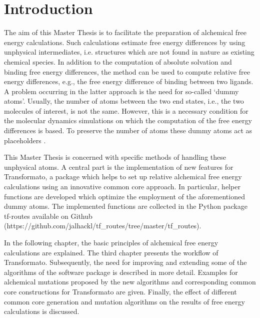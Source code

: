 \chapter{Introduction}

The aim of this Master Thesis is to facilitate the preparation of
alchemical free energy calculations. Such calculations
estimate free energy differences by using unphysical intermediates, i.e. structures
which are not found in nature as existing chemical species. In addition
to the computation of absolute solvation and binding free energy differences,
the method can be used to compute relative free energy differences, e.g.,
the free energy difference of binding between two ligands. A problem occurring
in the latter approach is the need for so-called \textquoteleft dummy
atoms\textquoteright . Usually, the number of atoms between the two
end states, i.e., the two molecules of interest, is not the same.
However, this is a necessary condition for the molecular dynamics
simulations on which the computation of the free energy differences
is based. To preserve the number of atoms these dummy atoms act as
placeholders\cite{Fleck.2021} \cite{Karwounopoulos.2022}.

This Master Thesis is concerned with specific methods of handling these unphysical
atoms. A central part is the implementation of new features
for Transformato, a package which helps to set up relative alchemical
free energy calculations using an innovative common core approach\cite{key-2}\cite{Wieder.2022}.
In particular, helper functions are developed which optimize the employment of
the aforementioned dummy atoms. 
The implemented functions are collected in the  Python package tf-routes available on Github (https://github.com/jalhackl/tf\_routes/tree/master/tf\_routes).

In the following chapter, the basic principles of alchemical free energy
calculations are explained. The third chapter presents the workflow
of Transformato. Subsequently, the need for improving and extending some of the algorithms of the software
package is described in more detail. Examples for alchemical mutations
proposed by the new algorithms and corresponding common core constructions
for Transformato are given. Finally, the effect of different common core generation and mutation
algorithms on the results of free energy calculations is discussed.